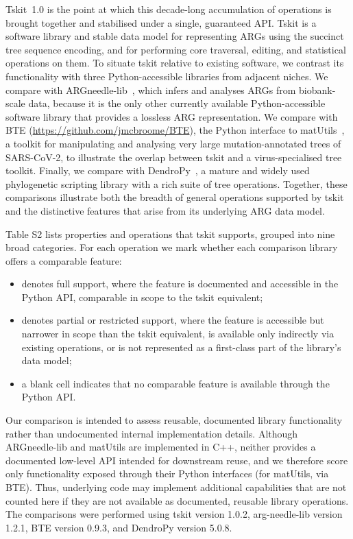 \documentclass{article}
\begin{document}
Tskit~1.0 is the point at which this
decade-long accumulation of operations is brought together and
stabilised under a single, guaranteed API.
Tskit is a software library and stable data model for
representing ARGs using the succinct tree sequence encoding,
and for performing core traversal, editing, and statistical operations on them.
To situate tskit relative to existing software, we contrast its functionality
with three Python-accessible libraries from adjacent niches.
We compare with
ARGneedle-lib~\citep{zhang2023biobank}, which infers and analyses ARGs from
biobank-scale data,
because it is the only other currently available Python-accessible software
library that provides a lossless ARG representation.
We compare with BTE (\url{https://github.com/jmcbroome/BTE}),
the Python interface to matUtils~\citep{mcbroome2021daily},
a toolkit for
manipulating and analysing very large mutation-annotated trees of SARS-CoV-2,
to illustrate the overlap between tskit and a virus-specialised tree toolkit.
Finally, we compare with DendroPy~\citep{sukumaran2010dendropy},
a mature and
widely used phylogenetic scripting library with a rich suite of tree
operations. Together, these comparisons illustrate both the breadth of general
operations supported by tskit and the distinctive features that arise from its
underlying ARG data model.

Table S2 lists properties and operations that tskit supports,
grouped
into nine broad categories.
For each operation we mark whether each comparison library offers a
comparable feature:
\begin{itemize}
\item[\checkmark{}] denotes full support, where the feature is
documented and accessible in the Python API, comparable in scope
to the tskit equivalent;
\item[$\circ$] denotes partial or restricted support, where the feature is
accessible but narrower in scope than the tskit equivalent, is available only
indirectly via existing operations, or is not represented as a first-class part
of the library’s data model;
\item[] a blank cell indicates that no comparable feature is available through
the Python API.
\end{itemize}
Our comparison is intended to assess reusable, documented library functionality
rather than undocumented internal implementation details. Although
ARGneedle-lib and matUtils are implemented in C++, neither provides a
documented low-level API intended for downstream reuse, and we therefore score
only functionality exposed through their Python interfaces (for matUtils, via BTE).
Thus, underlying
code may implement additional capabilities that are not counted here if they
are not available as documented, reusable library operations. The comparisons
were performed using tskit version 1.0.2, arg-needle-lib version 1.2.1, BTE
version 0.9.3, and DendroPy version 5.0.8.




\end{document}
